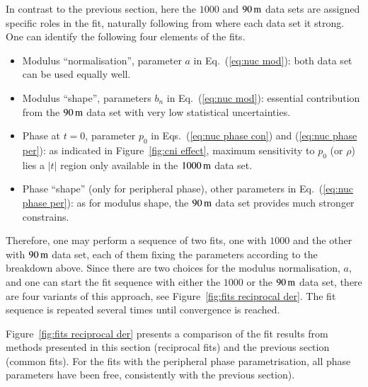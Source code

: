 In contrast to the previous section, here the $1000$ and $90\,{\rm m}$ data sets are assigned specific roles in the fit, naturally following from where each data set it strong. One can identify the following four elements of the fits.
\begin{itemize}
\item Modulus ``normalisation'', parameter $a$ in Eq.~(\ref{eq:nuc mod}): both data set can be used equally well.
\item Modulus ``shape'', parameters $b_n$ in Eq.~(\ref{eq:nuc mod}): essential contribution from the $90\,{\rm m}$ data set with very low statistical uncertainties.
\item Phase at $t = 0$, parameter $p_0$ in Eqs.~(\ref{eq:nuc phase con}) and (\ref{eq:nuc phase per}): as indicated in Figure~\ref{fig:cni effect}, maximum sensitivity to $p_0$ (or $\rho$) lies a $|t|$ region only available in the $1000\,{\rm m}$ data set.
\item Phase ``shape'' (only for peripheral phase), other parameters in Eq.~(\ref{eq:nuc phase per}): as for modulus shape, the $90\,{\rm m}$ data set provides much stronger constrains.
\end{itemize}
Therefore, one may perform a sequence of two fits, one with $1000$ and the other with $90\,{\rm m}$ data set, each of them fixing the parameters according to the breakdown above. Since there are two choices for the modulus normalisation, $a$, and one can start the fit sequence with either the $1000$ or the $90\,{\rm m}$ data set, there are four variants of this approach, see Figure~\ref{fig:fits reciprocal der}. The fit sequence is repeated several times until convergence is reached.

Figure~\ref{fig:fits reciprocal der} presents a comparison of the fit results from methods presented in this section (reciprocal fits) and the previous section (common fits). For the fits with the peripheral phase parametrisation, all phase parameters have been free, consistently with the previous section).

